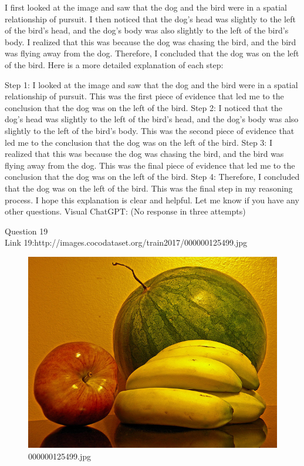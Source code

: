 \begin{enumerate}
        I first looked at the image and saw that the dog and the bird were in a spatial relationship of pursuit.
        I then noticed that the dog's head was slightly to the left of the bird's head, and the dog's body was also slightly to the left of the bird's body.
        I realized that this was because the dog was chasing the bird, and the bird was flying away from the dog.
        Therefore, I concluded that the dog was on the left of the bird.
        Here is a more detailed explanation of each step:

        Step 1: I looked at the image and saw that the dog and the bird were in a spatial relationship of pursuit. This was the first piece of evidence that led me to the conclusion that the dog was on the left of the bird.
        Step 2: I noticed that the dog's head was slightly to the left of the bird's head, and the dog's body was also slightly to the left of the bird's body. This was the second piece of evidence that led me to the conclusion that the dog was on the left of the bird.
        Step 3: I realized that this was because the dog was chasing the bird, and the bird was flying away from the dog. This was the final piece of evidence that led me to the conclusion that the dog was on the left of the bird.
        Step 4: Therefore, I concluded that the dog was on the left of the bird. This was the final step in my reasoning process.
        I hope this explanation is clear and helpful. Let me know if you have any other questions.
        \subitem Visual ChatGPT: (No response in three attempts)
    \end{enumerate}
Question 19\\
Link 19:http://images.cocodataset.org/train2017/000000125499.jpg
    \begin{figure}[h]
        \centering
        \includegraphics[width=0.8\linewidth]{../image set/easy/000000125499.jpg}
        \caption{000000125499.jpg}
    \end{figure}
